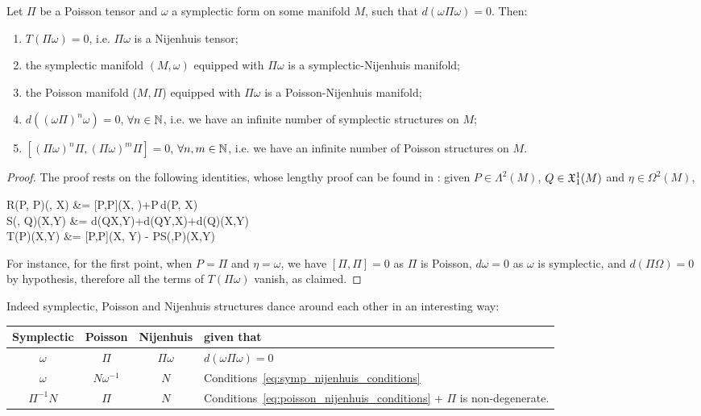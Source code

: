 \documentclass[main.tex]{subfiles}
\begin{document}
\begin{proposition}
	Let $\Pi$ be a Poisson tensor and $\omega$ a symplectic form on some manifold $M$, such that $d(\omega\Pi\omega) = 0$. Then:
	\begin{enumerate}
		\item $T(\Pi\omega)=0$, i.e. $\Pi\omega$ is a Nijenhuis tensor;
		\item the symplectic manifold $(M, \omega)$ equipped with $\Pi\omega$ is a symplectic-Nijenhuis manifold;
		\item the Poisson manifold ($M, \Pi$) equipped with $\Pi\omega$ is a Poisson-Nijenhuis manifold;
		\item $d((\omega\Pi)^n\omega)=0$, $\forall n \in \mathbb{N}$, i.e. we have an infinite number of symplectic structures on $M$;
		\item $[(\Pi\omega)^n\Pi, (\Pi\omega)^m\Pi]=0$, $\forall n,m\in\mathbb{N}$, i.e. we have an infinite number of Poisson structures on $M$.
	\end{enumerate}
\end{proposition}
\begin{proof}
	The proof rests on the following identities, whose lengthy proof can be found in \cite[Appendix B.3]{magri1984geometrical}: given  $P \in \Lambda^2(M)$, $Q \in \mathfrak{X}_1^1(M)$ and $\eta \in \Omega^2(M)$,
	\begin{eqalign}
		R(P, P\eta)(\alpha, X) &= [P,P](\eta X, \alpha)+P\,d\eta(P\alpha, X)\\
		S(\eta, Q)(X,Y) &= d\eta(QX,Y)+d\eta(QY,X)+d(\eta Q)(X,Y)\\
		T(P\eta)(X,Y) &= [P,P](\eta X, \eta Y) - PS(\eta,P\eta)(X,Y)
	\end{eqalign}
	For instance, for the first point, when $P = \Pi$ and $\eta = \omega$, we have $[\Pi, \Pi] = 0$ as $\Pi$ is Poisson, $d\omega = 0$ as $\omega$ is symplectic, and $d(\Pi\Omega) = 0$ by hypothesis, therefore all the terms of $T(\Pi\omega)$ vanish, as claimed.
\end{proof}

Indeed symplectic, Poisson and Nijenhuis structures dance around each other in an interesting way:

\begin{center}
	\begin{tabular}{c|c|c|l}
		\textbf{Symplectic} & \textbf{Poisson} & \textbf{Nijenhuis} & \textbf{given that}\\[1ex]
		\hline
		$\omega$ & $\Pi$ & $\Pi\omega$ & $d(\omega\Pi\omega) = 0$\\[1ex]
		$\omega$ & $N\omega^{-1}$ & $N$ & Conditions~\eqref{eq:symp_nijenhuis_conditions}\\
		$\Pi^{-1}N$ & $\Pi$ & $N$ & Conditions~\eqref{eq:poisson_nijenhuis_conditions} + $\Pi$ is non-degenerate.
	\end{tabular}
\end{center}
\end{document}
